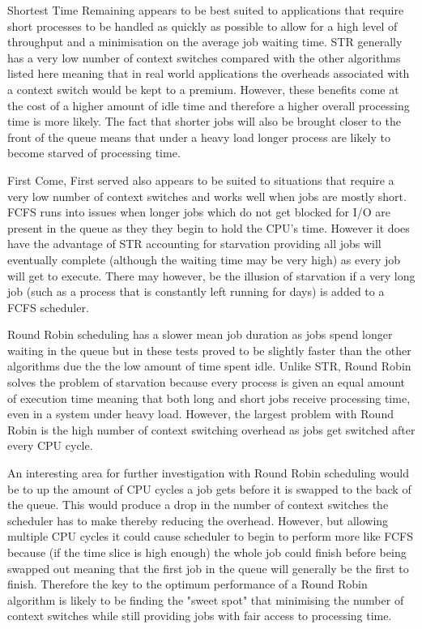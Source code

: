 \documentclass{acm_proc_article-sp}
\begin{document}
Shortest Time Remaining appears to be best suited to applications that require short processes to be handled as quickly as possible to allow for a high level of throughput and a minimisation on the average job waiting time. STR generally has a very low number of context switches compared with the other algorithms listed here meaning that in real world applications the overheads associated with a context switch would be kept to a premium. However, these benefits come at the cost of a higher amount of idle time and therefore a higher overall processing time is more likely. The fact that shorter jobs will also be brought closer to the front of the queue means that under a heavy load longer process are likely to become starved of processing time.

First Come, First served also appears to be suited to situations that require a very low number of context switches and works well when jobs are mostly short. FCFS runs into issues when longer jobs which do not get blocked for I/O are present in the queue as they they begin to hold the CPU's time. However it does have the advantage of STR accounting for starvation providing all jobs will eventually complete (although the waiting time may be very high) as every job will get to execute. There may however, be the illusion of starvation if a very long job (such as a process that is constantly left running for days) is added to a FCFS scheduler.

Round Robin scheduling has a slower mean job duration as jobs spend longer waiting in the queue but in these tests proved to be slightly faster than the other algorithms due the the low amount of time spent idle. Unlike STR, Round Robin solves the problem of starvation because every process is given an equal amount of execution time meaning that both long and short jobs receive processing time, even in a system under heavy load. However, the largest problem with Round Robin is the high number of context switching overhead as jobs get switched after every CPU cycle.

An interesting area for further investigation with Round Robin scheduling would be to up the amount of CPU cycles a job gets before it is swapped to the back of the queue. This would produce a drop in the number of context switches the scheduler has to make thereby reducing the overhead. However, but allowing multiple CPU cycles it could cause scheduler to begin to perform more like FCFS because (if the time slice is high enough) the whole job could finish before being swapped out meaning that the first job in the queue will generally be the first to finish. Therefore the key to  the optimum performance of a Round Robin algorithm is likely to be finding the "sweet spot" that minimising the number of context switches while still providing jobs with fair access to processing time.
\end{document}

